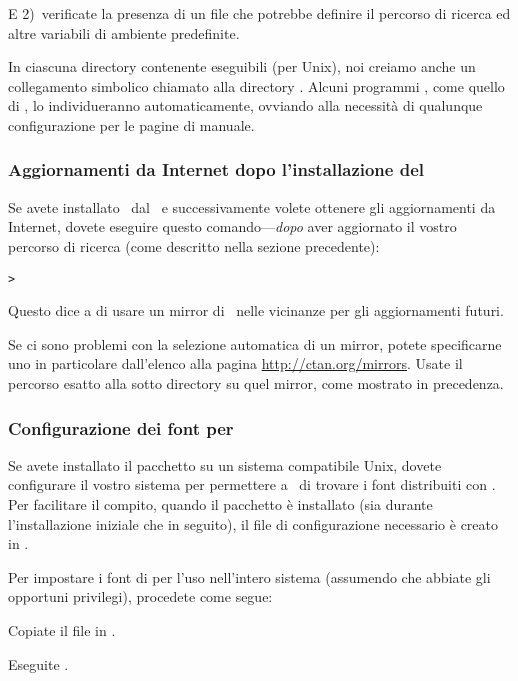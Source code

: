 \documentclass{article}
\begin{document}
E 2)~verificate la presenza di un file  che
potrebbe definire il percorso di ricerca ed altre variabili di ambiente
predefinite.

In ciascuna directory contenente eseguibili (per Unix), noi creiamo anche
un collegamento simbolico chiamato  alla directory
. Alcuni programmi , come quello di
\MacOSX, lo individueranno automaticamente, ovviando alla necessità di
qualunque configurazione per le pagine di manuale.


\subsubsection{Aggiornamenti da Internet dopo l'installazione del \DVD}
\label{sec:dvd-install-net-updates}

Se avete installato \TL\ dal \DVD\ e successivamente volete ottenere gli
aggiornamenti da Internet, dovete eseguire questo comando---\emph{dopo} aver
aggiornato il vostro percorso di ricerca (come descritto nella sezione
precedente):

\begin{alltt}
> 
\end{alltt}

Questo dice a  di usare un mirror di \CTAN\ nelle vicinanze
per gli aggiornamenti futuri.

Se ci sono problemi con la selezione automatica di un mirror, potete
specificarne uno in particolare dall'elenco alla pagina
\url{http://ctan.org/mirrors}. Usate il percorso esatto alla sotto directory
 su quel mirror, come mostrato in precedenza.


\subsubsection{Configurazione dei font per \XeTeX}
\label{sec:font-conf-xetex}

Se avete installato il pacchetto  su un sistema
compatibile Unix, dovete configurare il vostro sistema per permettere a
\XeTeX\ di trovare i font distribuiti con \TL. Per facilitare il compito,
quando il pacchetto  è installato (sia durante
l'installazione iniziale che in seguito), il file di configurazione
necessario è creato in
.

Per impostare i font di \TL{} per l'uso nell'intero sistema (assumendo che
abbiate gli opportuni privilegi), procedete come segue:
\begin{enumerate*}
\item Copiate il file  in
  .

\item Eseguite .
\end{enumerate*}
\end{document}
